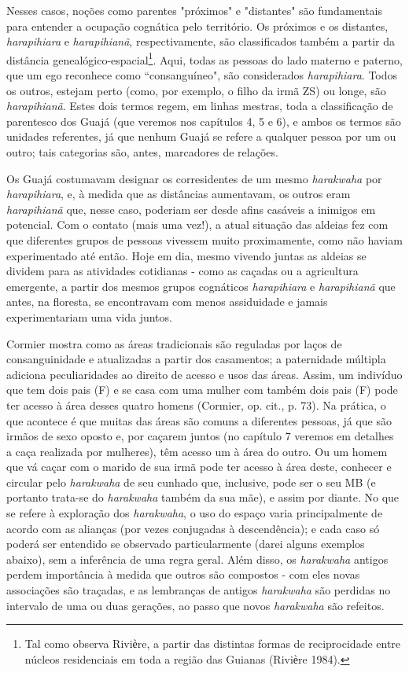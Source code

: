 Nesses casos, noções como parentes "próximos" e "distantes" são
fundamentais para entender a ocupação cognática pelo território. Os
próximos e os distantes, \emph{harapihiara} e \emph{harapihianã},
respectivamente, são classificados também a partir da distância
genealógico-espacial\footnote{Tal como observa Riviѐre, a partir das
  distintas formas de reciprocidade entre núcleos residenciais em toda a
  região das Guianas (Riviѐre 1984).}. Aqui, todas as pessoas do lado
materno e paterno, que um ego reconhece como ``consanguíneo", são
considerados \emph{harapihiara}. Todos os outros, estejam perto (como,
por exemplo, o filho da irmã ZS) ou longe, são \emph{harapihianã}. Estes
dois termos regem, em linhas mestras, toda a classificação de parentesco
dos Guajá (que veremos nos capítulos 4, 5 e 6), e ambos os termos são
unidades referentes, já que nenhum Guajá se refere a qualquer pessoa por
um ou outro; tais categorias são, antes, marcadores de relações.

Os Guajá costumavam designar os corresidentes de um mesmo
\emph{harakwaha} por \emph{harapihiara}, e, à medida que as distâncias
aumentavam, os outros eram \emph{harapihianã} que, nesse caso, poderiam
ser desde afins casáveis a inimigos em potencial. Com o contato (mais
uma vez!), a atual situação das aldeias fez com que diferentes grupos de
pessoas vivessem muito proximamente, como não haviam experimentado até
então. Hoje em dia, mesmo vivendo juntas as aldeias se dividem para as
atividades cotidianas - como as caçadas ou a agricultura emergente, a
partir dos mesmos grupos cognáticos \emph{harapihiara} e
\emph{harapihianã} que antes, na floresta, se encontravam com menos
assiduidade e jamais experimentariam uma vida juntos.

Cormier mostra como as áreas tradicionais são reguladas por laços de
consanguinidade e atualizadas a partir dos casamentos; a paternidade
múltipla adiciona peculiaridades ao direito de acesso e usos das áreas.
Assim, um indivíduo que tem dois pais (F) e se casa com uma mulher com
também dois pais (F) pode ter acesso à área desses quatro homens
(Cormier, op. cit., p. 73). Na prática, o que acontece é que muitas das
áreas são comuns a diferentes pessoas, já que são irmãos de sexo oposto
e, por caçarem juntos (no capítulo 7 veremos em detalhes a caça
realizada por mulheres), têm acesso um à área do outro. Ou um homem que
vá caçar com o marido de sua irmã pode ter acesso à área deste, conhecer
e circular pelo \emph{harakwaha} de seu cunhado que, inclusive, pode ser
o seu MB (e portanto trata-se do \emph{harakwaha} também da sua mãe), e
assim por diante. No que se refere à exploração dos \emph{harakwaha}, o
uso do espaço varia principalmente de acordo com as alianças (por vezes
conjugadas à descendência); e cada caso só poderá ser entendido se
observado particularmente (darei alguns exemplos abaixo), sem a
inferência de uma regra geral. Além disso, os \emph{harakwaha} antigos
perdem importância à medida que outros são compostos - com eles novas
associações são traçadas, e as lembranças de antigos \emph{harakwaha}
são perdidas no intervalo de uma ou duas gerações, ao passo que novos
\emph{harakwaha} são refeitos.

